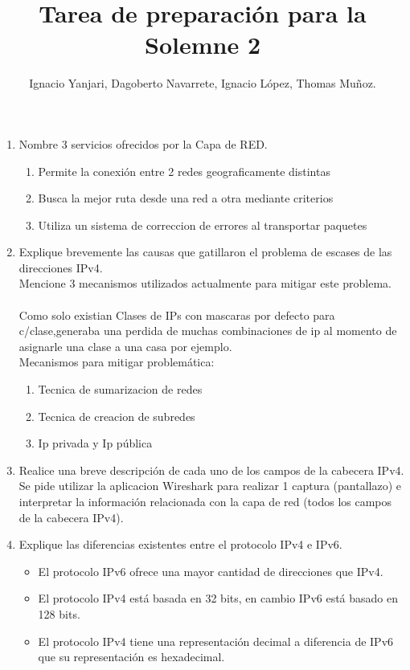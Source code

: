 \documentclass{udparticle}
\title{Tarea de preparación para la Solemne 2}
\author{Ignacio Yanjari, Dagoberto Navarrete, Ignacio López, Thomas Muñoz.}
\begin{document}
\maketitle
\begin{enumerate}
\item Nombre 3 servicios ofrecidos por la Capa de RED.
\begin{enumerate}
\item Permite la conexión entre 2 redes geograficamente distintas
\item Busca la mejor ruta desde una red a otra mediante criterios
\item Utiliza un sistema de correccion de errores al transportar paquetes
\end{enumerate}
\item Explique brevemente las causas que gatillaron el problema de escases de las direcciones IPv4.\\
Mencione 3 mecanismos utilizados actualmente para mitigar este problema.\\\\
Como solo existian Clases de IPs con mascaras por defecto para c/clase,generaba una 
perdida de muchas combinaciones de ip al momento de asignarle una clase a una casa por 
ejemplo.\\
Mecanismos para mitigar problemática:
\begin{enumerate}
\item Tecnica de sumarizacion de redes 
\item Tecnica de  creacion de subredes
\item Ip privada y Ip pública
\end{enumerate}
\item Realice una breve descripción de cada uno de los campos de la cabecera IPv4. Se pide utilizar la aplicacion Wireshark para realizar 1 captura (pantallazo) e interpretar la información relacionada con la capa de red (todos los campos de la cabecera IPv4).
\item Explique las diferencias existentes entre el protocolo IPv4 e IPv6.
\begin{itemize}
	\item El protocolo IPv6 ofrece una mayor cantidad de direcciones que IPv4.
	\item El protocolo IPv4 está basada en 32 bits, en cambio IPv6 está basado en 128 bits.
	\item El protocolo IPv4 tiene una representación decimal a diferencia de IPv6 que su representación es hexadecimal.
\end{itemize}

\end{enumerate}
\end{document}
